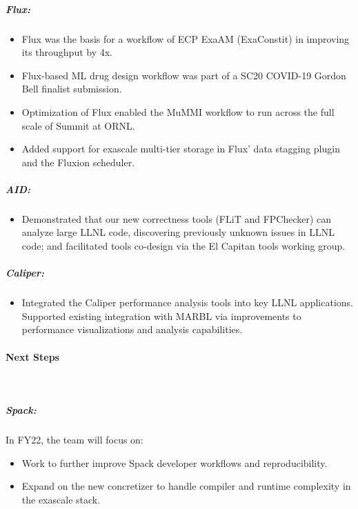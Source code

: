 \subparagraph{Flux:}

\begin{itemize}
\item Flux was the basis for a workflow of ECP ExaAM (ExaConstit) in improving its throughput by 4x.
\item Flux-based ML drug design workflow was part of a SC20 COVID-19 Gordon Bell finalist submission.
\item Optimization of Flux enabled the MuMMI workflow to run across the full scale of Summit at ORNL.
\item Added support for exascale multi-tier storage in Flux' data stagging plugin and the Fluxion scheduler.

\end{itemize}

\subparagraph{AID:}
\begin{itemize}

\item Demonstrated that our new correctness tools (FLiT and FPChecker) can analyze large LLNL code, discovering previously unknown issues in LLNL code; and facilitated tools co-design via the El Capitan tools working group.


\end{itemize}

\subparagraph{Caliper:}
\begin{itemize}
\item Integrated the Caliper performance analysis tools into key LLNL applications. Supported existing integration with MARBL via improvements to performance visualizations and analysis capabilities.
\end{itemize}


\paragraph{Next Steps} \leavevmode \\

\subparagraph{Spack:}
In FY22, the team will focus on:

\begin{itemize}
    \item Work to further improve Spack developer workflows and reproducibility.
    \item Expand on the new concretizer to handle compiler and runtime complexity in the exascale stack.
\end{itemize}

